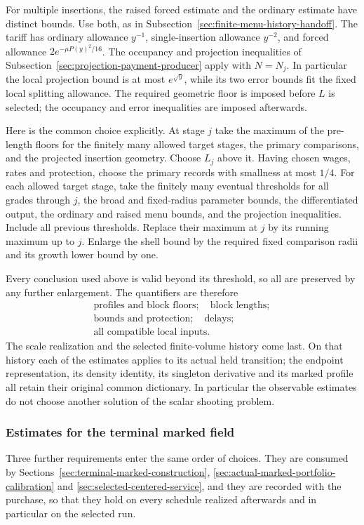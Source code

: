 For multiple insertions, the raised forced estimate and the
ordinary estimate have distinct bounds. Use both, as in
Subsection~\ref{sec:finite-menu-history-handoff}. The tariff has
ordinary allowance $y^{-1}$, single-insertion allowance $y^{-2}$,
and forced allowance $2e^{-\mu P(y)^2/16}$. The occupancy and
projection inequalities of
Subsection~\ref{sec:projection-payment-producer} apply with $N=N_j$.
In particular the local projection bound is at most $e^{\sqrt y}$,
while its two error bounds fit the fixed local splitting allowance.
The required geometric floor is imposed before $L$ is selected;
the occupancy and error inequalities are imposed afterwards.

Here is the common choice explicitly. At stage $j$ take the maximum
of the pre-length floors for the finitely many allowed target stages,
the primary comparisons, and the projected insertion geometry.
Choose $L_j$ above it. Having chosen wages, rates and protection,
choose the primary records with smallness at most $1/4$. For each
allowed target stage, take the finitely many eventual thresholds
for all grades through $j$, the broad and fixed-radius parameter
bounds, the differentiated output, the ordinary and raised menu
bounds, and the projection inequalities. Include all previous
thresholds. Replace their maximum at $j$ by its running maximum up
to $j$. Enlarge the shell bound by the required fixed comparison
radii and its growth lower bound by one.

Every conclusion used above is valid beyond its threshold, so all
are preserved by any further enlargement. The quantifiers are
therefore
\[
 \begin{gathered}
 \text{profiles and block floors};\quad\text{block lengths};\\
 \text{bounds and protection};\quad\text{delays};\\
 \text{all compatible local inputs}.
 \end{gathered}
\]
The scale realization and the selected finite-volume history come
last. On that history each of the estimates applies to its actual
held transition; the endpoint representation, its density identity,
its singleton derivative and its marked profile all retain their
original common dictionary. In particular the observable estimates
do not choose another solution of the scalar shooting problem.

\subsubsection{Estimates for the terminal marked field}
Three further requirements enter the same order of choices. They are
consumed by Sections~\ref{sec:terminal-marked-construction},
\ref{sec:actual-marked-portfolio-calibration} and
\ref{sec:selected-centered-service}, and they are recorded with the
purchase, so that they hold on every schedule realized afterwards and
in particular on the selected run.

